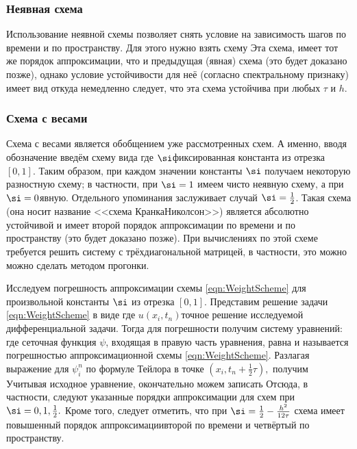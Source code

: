 \documentclass[a4paper]{article}
\begin{document}
\subsubsection{Неявная схема}
Использование неявной схемы позволяет снять условие на зависимость шагов по времени и по пространству.
Для этого нужно взять схему
Эта схема, имеет тот же порядок аппроксимации, что и предыдущая (явная) схема (это будет доказано позже), однако
условие устойчивости для неё (согласно спектральному признаку) имеет вид
откуда немедленно следует, что эта схема устойчива при любых $\tau$ и $h$.

\subsubsection{Схема с весами}

Схема с весами является обобщением уже рассмотренных схем. А именно, вводя обозначение
введём схему вида
где $\si$\т фиксированная константа из отрезка $[0,1]$. Таким образом, при каждом значении
константы $\si$ получаем некоторую разностную схему; в частности, при $\si=1$ имеем чисто неявную схему,
а при $\si=0$\т явную. Отдельного упоминания заслуживает случай $\si=\frac12$. Такая схема (она носит название <<схема Кранка\ч Николсон>>) является
абсолютно устойчивой и имеет второй порядок аппроксимации по времени и по пространству (это будет доказано позже). При вычислениях по этой схеме
требуется решить систему с трёхдиагональной матрицей, в частности, это можно можно сделать методом прогонки.

Исследуем погрешность аппроксимации схемы \eqref{eqn:WeightScheme} для произвольной константы $\si$ из отрезка $[0,1]$.
Представим решение задачи \eqref{eqn:WeightScheme} в виде
 где $u(x_i,t_n)$\т точное решение исследуемой дифференциальной задачи.
Тогда для погрешности получим систему уравнений:
где сеточная функция $\psi$, входящая в правую часть уравнения, равна
и называется погрешностью аппроксимационной схемы \eqref{eqn:WeightScheme}.
Разлагая выражение для $\psi_i^n$ по формуле Тейлора в точке $(x_i,t_n+\frac12\tau),$ получим
Учитывая исходное уравнение, окончательно можем записать
Отсюда, в частности, следуют указанные порядки аппроксимации для схем при $\si=0,1,\frac{1}{2}.$
Кроме того, следует отметить, что при $\si=\frac12-\frac{h^2}{12\tau}$ схема имеет повышенный порядок аппроксимации\т второй по
времени и четвёртый по пространству.
\end{document}

